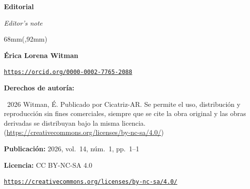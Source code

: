\documentclass{article}
\renewcommand{\normalsize}{\fontsize{10pt}{13pt}\selectfont}
\newlength{\gbbloquex}
\newcommand{\articulotipo}{}
\newcommand{\articulotitulo}{}
\newcommand{\articulotitulotrans}{}
\newcommand{\articuloautores}{}
\newcommand{\articuloidiomaxml}{es}
\newcommand{\articulorevista}{}
\newcommand{\articuloissne}{}
\newcommand{\articulovolumen}{}
\newcommand{\articulonumero}{}
\newcommand{\articulofecha}{}
\newcommand{\articulopagina}{0}
\begin{document}

\renewcommand{\articuloidiomaxml}{es}
\renewcommand{\articulotitulo}{Editorial}
\renewcommand{\articuloautores}{Érica Lorena Witman}
\renewcommand{\articulotipo}{EDITORIAL}
\renewcommand{\articulorevista}{Cicatriz-AR}
\renewcommand{\articuloissne}{2618-3536}
\renewcommand{\articulovolumen}{14}
\renewcommand{\articulonumero}{1}
\renewcommand{\articulofecha}{ 2026}
\renewcommand{\articulopagina}{1}

\setcounter{page}{1}
\thispagestyle{firstpage}

\noindent\begin{minipage}[t]{\dimexpr\textwidth+\marginparsep+\marginparwidth\relax}%
{\sffamily\bfseries\Large\articulotitulo\par}%
\end{minipage}\par
\vspace{3mm}%
\renewcommand{\articulotitulotrans}{Editor's note}
\noindent\begin{minipage}[t]{\dimexpr\textwidth+\marginparsep+\marginparwidth\relax}%
{\sffamily\itshape\normalsize\articulotitulotrans\par}%
\end{minipage}\par
\vspace{4mm}%

\begin{textblock*}{68mm}(\gbbloquex,92mm)
{\setlength{\leftskip}{0pt}\setlength{\parindent}{0pt}%
\noindent\begin{minipage}[t]{68mm}
\sffamily\small\setlength{\parskip}{1pt}
{\bfseries\color{azulrevista}Érica Lorena Witman}\par
{\scriptsize\texttt{\href{https://orcid.org/0000-0002-7765-2088}{https://orcid.org/0000-0002-7765-2088}}}\par
\vspace{6pt}
{\bfseries\color{azulrevista!70}Derechos de autor\'ia:}\par
\textcopyright\ 2026 Witman, É. Publicado por Cicatriz-AR. Se permite el uso, distribución y reproducción sin fines comerciales, siempre que se cite la obra original y las obras derivadas se distribuyan bajo la misma licencia. (\href{https://creativecommons.org/licenses/by-nc-sa/4.0/}{https://creativecommons.org/licenses/by-nc-sa/4.0/})\par\vspace{6pt}
{\bfseries\color{azulrevista!70}Publicación:} 2026, vol.~14, n\'um.~1, pp.~1--1\par\vspace{6pt}
{\bfseries\color{azulrevista!70}Licencia:} CC BY-NC-SA 4.0\par
{\scriptsize\texttt{\href{https://creativecommons.org/licenses/by-nc-sa/4.0/}{https://creativecommons.org/licenses/by-nc-sa/4.0/}}}\par
\vspace{6pt}
\end{minipage}%
}%
\end{textblock*}
\end{document}

